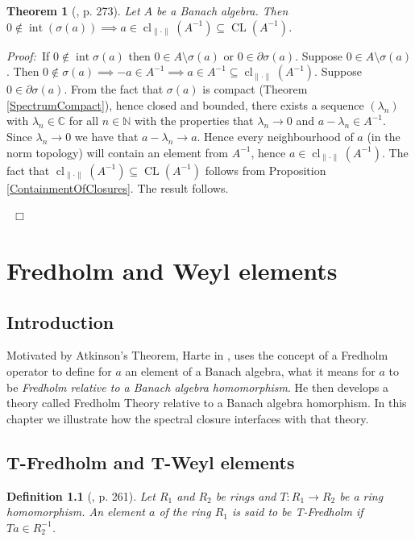 \documentclass[12pt, oneside]{book}
\newtheorem{theorem}{Theorem}[subsection]
\newtheorem{definition}[theorem]{Definition}
\newcommand{\proof}{{\noindent \it Proof:~}}
\newcommand{\qed}{\hfill ~$\Box$\\}
\def\inter{\operatorname{int}}
\def\cl{\operatorname{cl}}
\def\CL{\operatorname{CL}}
\begin{document}
\begin{theorem}[\cite{CH3}, p. 273]
\normalfont
\space Let $A$ be a Banach algebra. Then 
$0 \not \in \inter(\sigma(a)) \implies a \in \cl_{\|\cdot\|}(A^{-1}) \subseteq \CL(A^{-1})$.
\end{theorem}

\proof \space If $0 \notin \inter \sigma(a)$ then 
$0 \in A \setminus \sigma(a)$ or $0 \in \partial \sigma (a).$ 
\vskip 0.3cm
\noindent Suppose $0 \in A \setminus \sigma(a)$. 
Then 
$0 \not \in \sigma(a) \implies -a \in A^{-1} \implies a \in A^{-1} 
\subseteq \cl_{\|\cdot\|}(A^{-1})$.
\vskip 0.3cm
\noindent Suppose $0 \in \partial \sigma(a)$. From the fact that $\sigma(a)$ is compact 
(Theorem \ref{SpectrumCompact}), hence closed and bounded, there exists a sequence 
$(\lambda_n)$ with $\lambda_n \in \mathbb{C}$ for all $n \in \mathbb{N}$ with the properties that 
$\lambda_n \rightarrow 0$ and $a - \lambda_n \in A^{-1}.$ Since $\lambda_n \rightarrow 0$ 
we have that $a - \lambda_n \rightarrow a$. 
Hence every neighbourhood of $a$ (in the norm topology) will contain an element from $A^{-1}$, 
hence $a \in \cl_{\|\cdot\|}(A^{-1})$. The fact that $\cl_{\|\cdot\|}(A^{-1}) \subseteq \CL(A^{-1})$ 
follows from Proposition \ref{ContainmentOfClosures}. The result follows.

\qed
\vskip 2cm
\begin{center}
\maltese
\end{center}
\chapter{Fredholm and Weyl elements}

\section{Introduction}
\noindent Motivated by Atkinson's Theorem, Harte in \cite{H0}, uses the concept of a 
Fredholm operator to define for $a$ an element of a Banach algebra, what it means for $a$ to be {\sl Fredholm  relative to a Banach algebra homomorphism}. 
He then develops a theory called Fredholm Theory relative to a Banach algebra homorphism. In this chapter we illustrate how the spectral closure interfaces with that theory.

\section{T-Fredholm and T-Weyl elements}

\begin{definition}[\cite{H1}, p. 261] 
\normalfont
\noindent Let $R_1$ and $R_2$ be rings and $T: R_1 \to R_2$ be a ring homomorphism. An element $a$ of the 
ring $R_1$ is said to be {\sl T-Fredholm} if $Ta \in R_2^{-1}$.
\end{definition}
\end{document}
